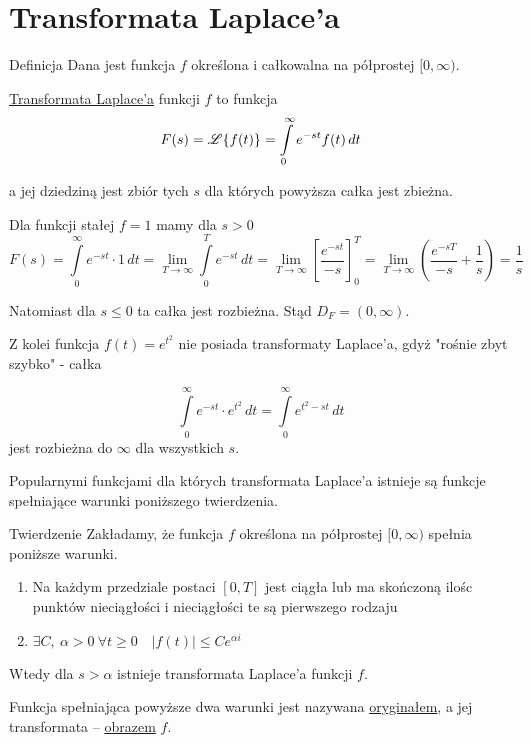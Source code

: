 \section{Transformata Laplace'a}

\begin{tw}{Definicja}
    Dana jest funkcja $f$ określona i całkowalna na półprostej $ [0, \infty) $.

    \underline{Transformata Laplace'a} funkcji $f$ to funkcja
    \[ F(s) = \mathscr{L} \{ f(t) \} = \int\limits_{0}^{\infty} e^{-st} f(t) \, dt \]

    a jej dziedziną jest zbiór tych $s$ dla których powyższa całka jest zbieżna.
\end{tw}

\begin{przyklad}
    Dla funkcji stałej $f = 1$ mamy dla $s > 0$
    \[ F(s) = \int\limits_{0}^{\infty} e^{-st} \cdot 1 \, dt = \lim_{T \to \infty} \int\limits_{0}^{T} e^{-st} \, dt =
    \lim_{T \to \infty} \left[ \frac{e^{-st}}{-s} \right]_{0}^{T} = \lim_{T \to \infty} \left( \frac{e^{-sT}}{-s} + \frac{1}{s} \right) = \frac{1}{s} \]

    Natomiast dla $s \leq 0$ ta całka jest rozbieżna. Stąd $ D_F = (0, \infty) $.

    Z kolei funkcja $f(t) = e^{t^2}$ nie posiada transformaty Laplace'a, gdyż "rośnie zbyt szybko" - całka

    \[ \int\limits_{0}^{\infty} e^{-st} \cdot e^{t^2} \, dt = \int\limits_{0}^{\infty} e^{t^2 - st} \, dt \]
    jest rozbieżna do $\infty$ dla wszystkich $s$.
\end{przyklad}

Popularnymi funkcjami dla których transformata Laplace'a istnieje są funkcje spełniające warunki poniższego twierdzenia.

\begin{tw}{Twierdzenie}
    Zakładamy, że funkcja $f$ określona na półprostej $ [0, \infty) $ spełnia poniższe warunki.
    \begin{enumerate}
        \item Na każdym przedziale postaci $ [0,T] $ jest ciągła lub ma skończoną ilośc punktów nieciągłości i nieciągłości te są pierwszego rodzaju
        \item $ \exists C, \ \alpha > 0 \ \forall t \geq 0 \quad |f(t)| \leq Ce^{\alpha i} $      
    \end{enumerate}
    Wtedy dla $s > \alpha$ istnieje transformata Laplace'a funkcji $f$.

    Funkcja spełniająca powyższe dwa warunki jest nazywana \underline{oryginałem}, a jej transformata -- \underline{obrazem} $f$.
\end{tw}

